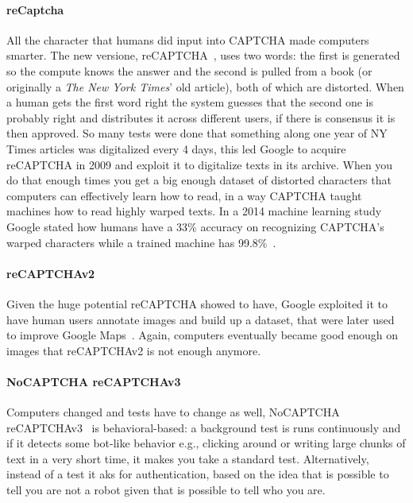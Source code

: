 \paragraph{reCaptcha}
All the character that humans did input into CAPTCHA made computers smarter.
The new versione, reCAPTCHA~\cite{ahn2008recaptcha}, uses two words: the first is generated so the compute knows the answer and the second is pulled from a book (or originally a \emph{The New York Times}' old article), both of which are distorted.
When a human gets the first word right the system guesses that the second one is probably right and distributes it across different users, if there is consensus it is then approved.
So many tests were done that something along one year of NY Times articles was digitalized every 4 days, this led Google to acquire reCAPTCHA in 2009 and exploit it to digitalize texts in its archive.
When you do that enough times you get a big enough dataset of distorted characters that computers can effectively learn how to read, in a way CAPTCHA taught machines how to read highly warped texts.
In a 2014 machine learning study Google stated how humans have a 33\% accuracy on recognizing CAPTCHA's warped characters while a trained machine has 99.8\%~\cite{google2014recaptcha}.

\paragraph{reCAPTCHAv2}
Given the huge potential reCAPTCHA showed to have, Google exploited it to have human users annotate images and build up a dataset, that were later used to improve Google Maps~\cite{vox2021captcha}.
Again, computers eventually became good enough on images that reCAPTCHAv2 is not enough anymore.

\paragraph{NoCAPTCHA reCAPTCHAv3}
Computers changed and tests have to change as well, NoCAPTCHA reCAPTCHAv3~\cite{google2014nocaptcha} is behavioral-based: a background test is runs continuously and if it detects some bot-like behavior e.g., clicking around or writing large chunks of text in a very short time, it makes you take a standard test.
Alternatively, instead of a test it aks for authentication, based on the idea that is possible to tell you are not a robot given that is possible to tell who you are.


